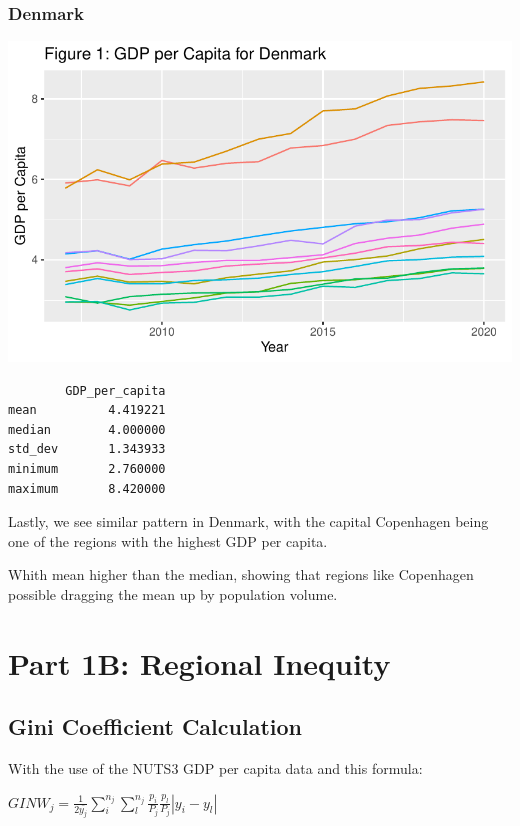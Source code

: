 \documentclass[
  a4paper,
  DIV=11,
  numbers=noendperiod]{scrartcl}
\begin{document}
\hypertarget{denmark}{%
\subsubsection{Denmark}\label{denmark}}

\includegraphics{MSB104_GR_1_Final_Assignment_research_article_files/figure-pdf/unnamed-chunk-19-1.pdf}

\begin{verbatim}
        GDP_per_capita
mean          4.419221
median        4.000000
std_dev       1.343933
minimum       2.760000
maximum       8.420000
\end{verbatim}

Lastly, we see similar pattern in Denmark, with the capital Copenhagen
being one of the regions with the highest GDP per capita.

Whith mean higher than the median, showing that regions like Copenhagen
possible dragging the mean up by population volume.

\hypertarget{part-1b-regional-inequity}{%
\section{Part 1B: Regional Inequity}\label{part-1b-regional-inequity}}

\hypertarget{gini-coefficient-calculation}{%
\subsection{Gini Coefficient
Calculation}\label{gini-coefficient-calculation}}

With the use of the NUTS3 GDP per capita data and this formula:

\(GINW_j=\frac{1}{2 \bar{y_j}} \sum_{i}^{n_j}\sum_{l}^{n_j}\frac{p_i}{P_j} \frac{p_l}{P_j} |y_i-y_l|\)
\end{document}
